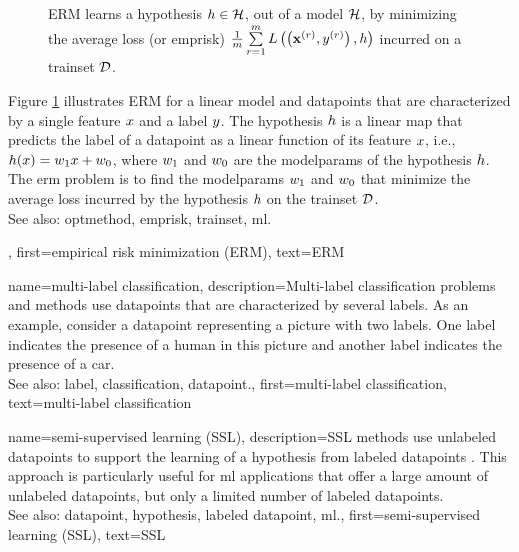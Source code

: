 {{\begin{figure}[H]
\begin{center}
\begin{tikzpicture}[scale = 1]
				\end{tikzpicture}
				\caption{ERM learns a \gls{hypothesis} $\hypothesis\in \hypospace$, out of a \gls{model} $\hypospace$, 
				by minimizing the average \gls{loss} (or \gls{emprisk}) $\frac{1}{\samplesize} \sum\limits_{\sampleidx=1}^\samplesize \lossfunc{\pair{\featurevec^{(\sampleidx)}}{ \truelabel^{(\sampleidx)}}}{\hypothesis}$ 
				incurred on a \gls{trainset} $\dataset$. \label{fig_erm_dict} }
			\end{center}
		\end{figure} 
		Figure \ref{fig_erm_dict} illustrates ERM for a linear \gls{model} and \glspl{datapoint} 
		that are characterized by a single \gls{feature} $\feature$ and a \gls{label} $\truelabel$. 
		The \gls{hypothesis} $\hypothesis$ is a linear \gls{map} that predicts the \gls{label} of a \gls{datapoint} 
		as a linear \gls{function} of its \gls{feature} $\feature$, i.e., 
		$\hypothesis(\feature) = \weight_{1} \feature + \weight_{0}$, where $\weight_{1}$ and $\weight_{0}$ are the 
		\gls{modelparams} of the \gls{hypothesis} $\hypothesis$. The \gls{erm} problem is to find the 
		\gls{modelparams} $\weight_{1}$ and $\weight_{0}$ that minimize the average \gls{loss} 
		incurred by the \gls{hypothesis} $\hypothesis$ on the \gls{trainset} $\dataset$.	
				\\
		See also: \gls{optmethod}, \gls{emprisk}, \gls{trainset}, \gls{ml}.},
	first={empirical risk minimization (ERM)},
	text={ERM} 
}


{name={multi-label classification}, 
	description={Multi-\gls{label} 
		\gls{classification} problems and methods use \glspl{datapoint} 
		that are characterized by several \glspl{label}. As an example, consider a \gls{datapoint} 
		representing a picture with two \glspl{label}. One \gls{label} indicates the presence of a human 
		in this picture and another \gls{label} indicates the presence of a car.
				\\
		See also: \gls{label}, \gls{classification}, \gls{datapoint}.},
	    first={multi-label classification},
	    text={multi-label classification} 
}


{name={semi-supervised learning (SSL)}, 
	description={SSL methods use unlabeled \glspl{datapoint}
		to support the learning of a \gls{hypothesis} from \glspl{labeled datapoint} \cite{SemiSupervisedBook}. 
		This approach is particularly useful for \gls{ml} applications that offer a large amount of 
		unlabeled \glspl{datapoint}, but only a limited number of \glspl{labeled datapoint}.
			\\
		See also: \gls{datapoint}, \gls{hypothesis}, \gls{labeled datapoint}, \gls{ml}.}, 
	first={semi-supervised learning (SSL)},
	text={SSL} 
}
	
